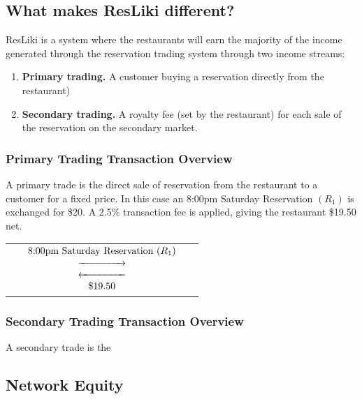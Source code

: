 \documentclass{article}
\begin{document}
	\subsection{What makes ResLiki different?}
	\hspace{1cm} ResLiki is a system where the restaurants will earn the majority of the income generated through the reservation trading system through two income streams:
		\begin{enumerate}[label=\textbf{\Roman*}.]
			\item \textbf{Primary trading.}  A customer buying a reservation directly from the restaurant)
			\item \textbf{Secondary trading.}  A royalty fee (set by the restaurant) for each sale of the reservation on the secondary market.
		\end{enumerate}
	\subsubsection{Primary Trading Transaction Overview}
	\hspace{1cm}A primary trade is the direct sale of reservation from the restaurant to a customer for a fixed price.  In this case an 8:00pm Saturday Reservation $(R_{1})$ is exchanged for \$20.  A 2.5\% transaction fee is applied, giving the restaurant \$19.50 net.
	\begin{center}
		\begin{tabular}{l c r}
			\text{Restaurant} & 
			$\begin{array}{c}
				\text{8:00pm Saturday Reservation } (R_{1}) \\
			      	\xrightarrow{\hspace*{1.5cm}} \\
					\xleftarrow{\hspace*{1.5cm}} \\
				\text{\$19.50}
			\end{array}$ & 
			\text{Customer}
		\end{tabular}
	\end{center}
	\subsubsection{Secondary Trading Transaction Overview}
	\hspace{1cm}A secondary trade is the 
	
	\subsection{Network Equity}
		
\end{document}
